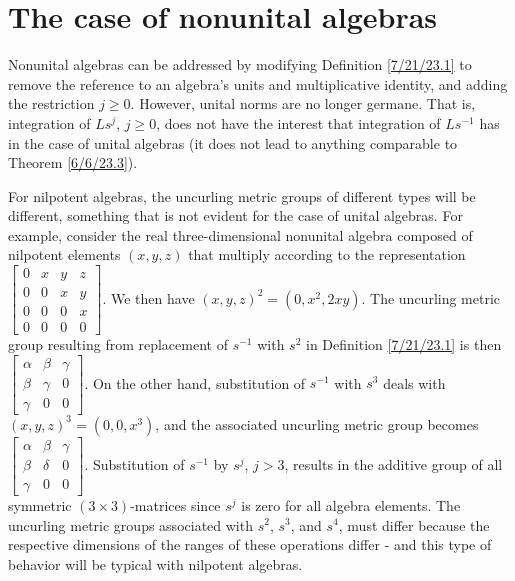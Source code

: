 \documentclass{amsart}
\numberwithin{equation}{section}
\theoremstyle{definition}
\numberwithin{theorem}{section}
\begin{document}
 \section{The case of nonunital algebras} Nonunital algebras can be addressed by modifying Definition \ref{7/21/23.1} to remove the reference to an algebra's units and multiplicative identity, and adding the restriction $j\ge 0$.   However, unital norms are no longer germane.  That is, integration of $Ls^j$, $j\ge 0$, does not have the interest that integration of $Ls^{-1}$ has in the case of unital algebras (it does not lead to anything comparable to Theorem \ref{6/6/23.3}).

For nilpotent algebras, the uncurling metric groups of different types will be different, something that is not evident for the case of unital algebras. For example, consider the real three-dimensional nonunital algebra composed of nilpotent elements $(x,y,z)$ that multiply according to the representation
  $ \left[
\begin{array}{ccccc}
0 & x & y & z  \\
0 & 0 & x & y \\
0 & 0 & 0 & x \\
0 & 0 & 0 & 0
\end{array}
\right] $.  We then have $(x,y,z)^2 = (0,x^2, 2xy)$.  The uncurling metric group resulting from replacement of $s^{-1}$ with  $s^2$ in Definition \ref{7/21/23.1} is then $\left[
\begin{array}{ccccc}
\alpha & \beta & \gamma   \\
\beta & \gamma & 0 \\
\gamma & 0 & 0  
\end{array}
\right] $.  On the other hand, substitution of $s^{-1}$ with $s^3$  deals with $(x,y,z)^3 = (0,0, x^3)$, and the associated uncurling metric group becomes $\left[
\begin{array}{ccccc}
\alpha & \beta & \gamma   \\
\beta & \delta & 0 \\
\gamma & 0 & 0  
\end{array}
\right] $.  Substitution of $s^{-1}$ by $s^j$, $j>3$, results in the additive group of all symmetric $(3\times 3)$-matrices since $s^j$ is zero for all algebra elements.  The uncurling metric groups associated with $s^2$, $s^3$, and \enlargethispage{1cm} $s^4$, must differ because the respective dimensions of the ranges of these operations differ - and this type of behavior will be typical with nilpotent algebras.  
 
\end{document}
